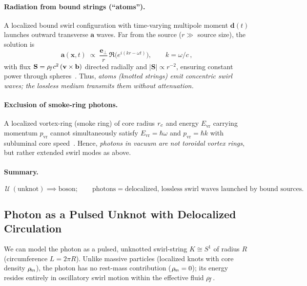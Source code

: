 \documentclass[11pt]{article}
\begin{document}
\paragraph{Radiation from bound strings (``atoms'').}
    A localized bound swirl configuration with time-varying multipole moment $\mathbf{d}(t)$ launches outward transverse $\mathbf{a}$ waves. Far from the source ($r \gg$ source size), the solution is
    \[
        \mathbf{a}(\mathbf{x},t) \;\propto\; \frac{\mathbf{e}_\perp}{r}\,\Re\!\big(e^{i(kr-\omega t)}\big), \qquad k=\omega/c\,,
    \]
    with flux $\mathbf{S}=\rho_{\!f} c^2\,(\mathbf{v}\times\mathbf{b})$ directed radially and $|\mathbf{S}|\propto r^{-2}$, ensuring constant power through spheres~\cite{Jackson1999}. Thus, \emph{atoms (knotted strings) emit concentric swirl waves; the lossless medium transmits them without attenuation.}

\paragraph{Exclusion of smoke-ring photons.}
    A localized vortex-ring (smoke ring) of core radius $r_c$ and energy $E_{\text{vr}}$ carrying momentum $p_{\text{vr}}$ cannot simultaneously satisfy $E_{\text{vr}}=\hbar\omega$ and $p_{\text{vr}}=\hbar k$ with subluminal core speed~\cite{Saffman1992,Batchelor1967}. Hence, \emph{photons in vacuum are not toroidal vortex rings}, but rather extended swirl modes as above.

\paragraph{Summary.}
    \[
        \boxed{\,\mathcal{U} \ (\text{unknot}) \implies \text{boson}; \qquad
        \text{photons} = \text{delocalized, lossless swirl waves launched by bound sources.}\,}
    \]

\subsection{Photon as a Pulsed Unknot with Delocalized Circulation}
\label{sec:photon_pulsed_unknot}
We can model the photon as a pulsed, unknotted swirl-string $K \cong S^1$ of radius $R$ (circumference $L=2\pi R$). Unlike massive particles (localized knots with core density $\rho_{\!m}$), the photon has no rest-mass contribution ($\rho_{\!m}=0$); its energy resides entirely in oscillatory swirl motion within the effective fluid $\rho_{\!f}$.
\end{document}
